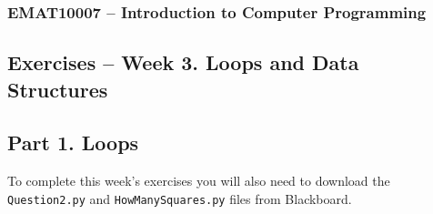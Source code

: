 \documentclass[11pt]{report}
\begin{document}
\subsubsection*{EMAT10007 -- Introduction to Computer Programming}
\subsection*{\Large Exercises -- Week 3. Loops and Data Structures}

\subsection*{\Large Part 1. Loops}
To complete this week's exercises you will also need to download the {\tt Question2.py} and {\tt HowManySquares.py} files from Blackboard.
\end{document}
